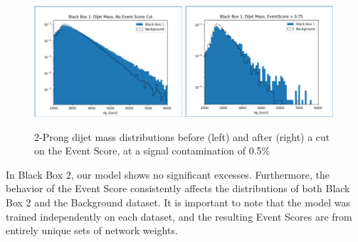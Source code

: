 \documentclass[letterpaper,11pt]{article}
\begin{document}
\begin{figure}[h!]
	\begin{center}
		\includegraphics[width=0.49\textwidth]{imgs/BB1.png}
		\includegraphics[width=0.49\textwidth]{imgs/BB1_Cut.png}
	\end{center}
	\caption{2-Prong dijet mass distributions before (left) and after (right) a cut on the Event Score, at a signal contamination of 0.5\%}
	\label{fig:bb1}
\end{figure}

In Black Box 2, our model shows no significant excesses. Furthermore, the behavior of the Event Score consistently affects the distributions of both Black Box 2 and the Background dataset. It is important to note that the model was trained independently on each dataset, and the resulting Event Scores are from entirely unique sets of network weights.
\end{document}

